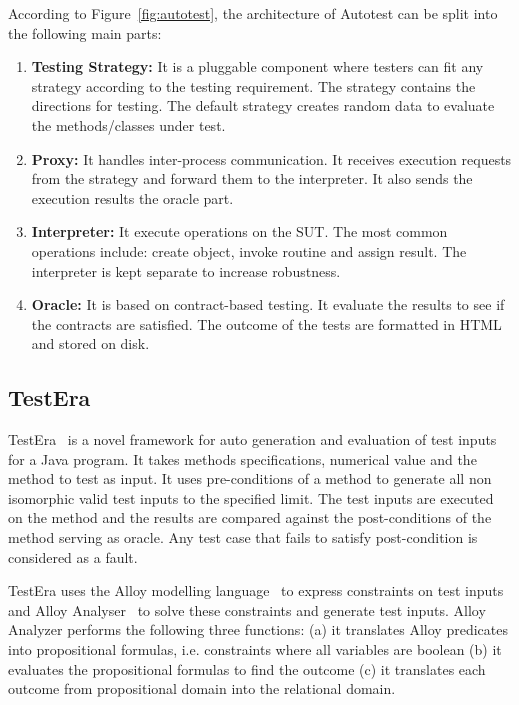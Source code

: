 \noindent According to Figure~\ref{fig:autotest}, the architecture of Autotest can be split into the following main parts:
\begin{enumerate}
\item \textbf{Testing Strategy:} It is a pluggable component where testers can fit any strategy according to the testing requirement. The strategy contains the directions for testing.%
The default strategy creates random data to evaluate the methods/classes under test.
\item \textbf{Proxy:} It handles inter-process communication. It receives execution requests from the strategy and forward them to the interpreter. It also sends the execution results the oracle part.
\item \textbf{Interpreter:} It execute operations on the SUT. The most common operations include: create object, invoke routine and assign result. The interpreter is kept separate to increase robustness.
\item \textbf{Oracle:} It is based on contract-based testing. It evaluate the results to see if the contracts are satisfied. The outcome of the tests are formatted in HTML and stored on disk.
\end{enumerate}

\subsection{TestEra}
TestEra~\cite{marinov2001testera} is a novel framework for auto generation and evaluation of test inputs for a Java program. It takes methods specifications, numerical value and the method to test as input. It uses pre-conditions of a method to generate all non isomorphic valid test inputs to the specified limit. The test inputs are executed on the method and the results are compared against the post-conditions of the method serving as oracle. Any test case that fails to satisfy post-condition is considered as a fault. 

TestEra uses the Alloy modelling language~\cite{jackson2001micromodularity} to express constraints on test inputs and Alloy Analyser~\cite{jackson2000alcoa} to solve these constraints and generate test inputs. Alloy Analyzer performs the following three functions: (a) it translates Alloy predicates into propositional formulas, i.e. constraints where all variables are boolean (b) it evaluates the propositional formulas to find the outcome (c) it translates each outcome from propositional domain into the relational domain.

